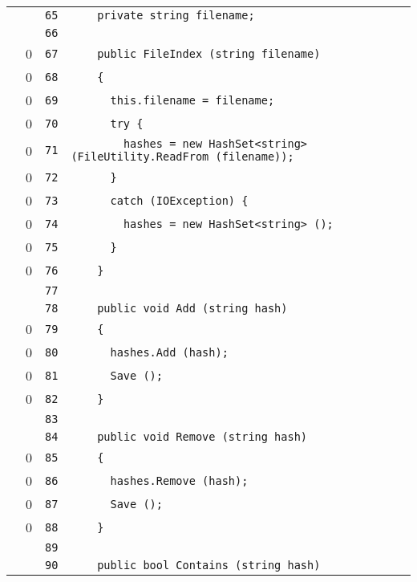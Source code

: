 \documentclass[a4paper,10pt]{article}
\begin{document}
\begin{longtable}[l]{lrrl}
\cellcolor{gray} &  & \verb~65~ & \verb~    private string filename;~\\
\cellcolor{gray} &  & \verb~66~ & \verb~~\\
\cellcolor{red} & 0 & \verb~67~ & \verb~    public FileIndex (string filename)~\\
\cellcolor{red} & 0 & \verb~68~ & \verb~    {~\\
\cellcolor{red} & 0 & \verb~69~ & \verb~      this.filename = filename;~\\
\cellcolor{red} & 0 & \verb~70~ & \verb~      try {~\\
\cellcolor{red} & 0 & \verb~71~ & \verb~        hashes = new HashSet<string> (FileUtility.ReadFrom (filename));~\\
\cellcolor{red} & 0 & \verb~72~ & \verb~      }~\\
\cellcolor{red} & 0 & \verb~73~ & \verb~      catch (IOException) {~\\
\cellcolor{red} & 0 & \verb~74~ & \verb~        hashes = new HashSet<string> ();~\\
\cellcolor{red} & 0 & \verb~75~ & \verb~      }~\\
\cellcolor{red} & 0 & \verb~76~ & \verb~    }~\\
\cellcolor{gray} &  & \verb~77~ & \verb~~\\
\cellcolor{gray} &  & \verb~78~ & \verb~    public void Add (string hash)~\\
\cellcolor{red} & 0 & \verb~79~ & \verb~    {~\\
\cellcolor{red} & 0 & \verb~80~ & \verb~      hashes.Add (hash);~\\
\cellcolor{red} & 0 & \verb~81~ & \verb~      Save ();~\\
\cellcolor{red} & 0 & \verb~82~ & \verb~    }~\\
\cellcolor{gray} &  & \verb~83~ & \verb~~\\
\cellcolor{gray} &  & \verb~84~ & \verb~    public void Remove (string hash)~\\
\cellcolor{red} & 0 & \verb~85~ & \verb~    {~\\
\cellcolor{red} & 0 & \verb~86~ & \verb~      hashes.Remove (hash);~\\
\cellcolor{red} & 0 & \verb~87~ & \verb~      Save ();~\\
\cellcolor{red} & 0 & \verb~88~ & \verb~    }~\\
\cellcolor{gray} &  & \verb~89~ & \verb~~\\
\cellcolor{gray} &  & \verb~90~ & \verb~    public bool Contains (string hash)~\\

\end{longtable}
\end{document}
